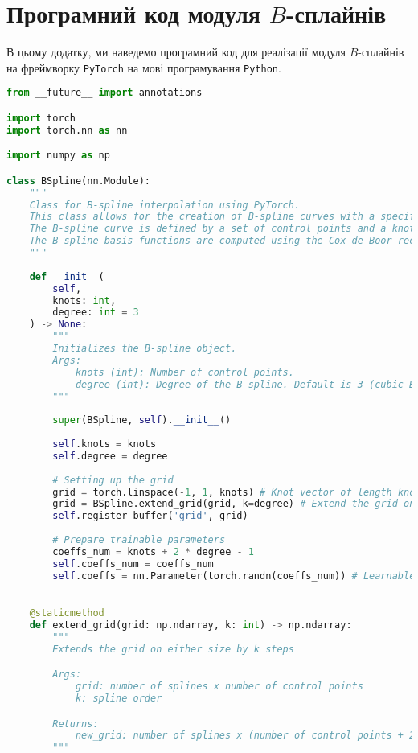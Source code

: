 \chapter{Програмний код модуля $B$-сплайнів}\label{appendix:b-spline-code}
В цьому додатку, ми наведемо програмний код для реалізації модуля
$B$-сплайнів на фреймворку \texttt{PyTorch} на мові програмування
\texttt{Python}. 
\begin{lstlisting}[language=Python]
from __future__ import annotations

import torch
import torch.nn as nn

import numpy as np

class BSpline(nn.Module):
    """
    Class for B-spline interpolation using PyTorch.
    This class allows for the creation of B-spline curves with a specified number of control points and degree.
    The B-spline curve is defined by a set of control points and a knot vector.
    The B-spline basis functions are computed using the Cox-de Boor recursion formula.
    """
    
    def __init__(
        self, 
        knots: int, 
        degree: int = 3
    ) -> None:
        """
        Initializes the B-spline object.
        Args:
            knots (int): Number of control points.
            degree (int): Degree of the B-spline. Default is 3 (cubic B-spline).
        """
        
        super(BSpline, self).__init__()
        
        self.knots = knots
        self.degree = degree
        
        # Setting up the grid
        grid = torch.linspace(-1, 1, knots) # Knot vector of length knots + degree + 1
        grid = BSpline.extend_grid(grid, k=degree) # Extend the grid on either side by degree steps
        self.register_buffer('grid', grid)
        
        # Prepare trainable parameters
        coeffs_num = knots + 2 * degree - 1
        self.coeffs_num = coeffs_num
        self.coeffs = nn.Parameter(torch.randn(coeffs_num)) # Learnable coefficients
        

    @staticmethod
    def extend_grid(grid: np.ndarray, k: int) -> np.ndarray:
        """
        Extends the grid on either size by k steps

        Args:
            grid: number of splines x number of control points
            k: spline order

        Returns:
            new_grid: number of splines x (number of control points + 2 * k)
        """
        

\end{lstlisting}
